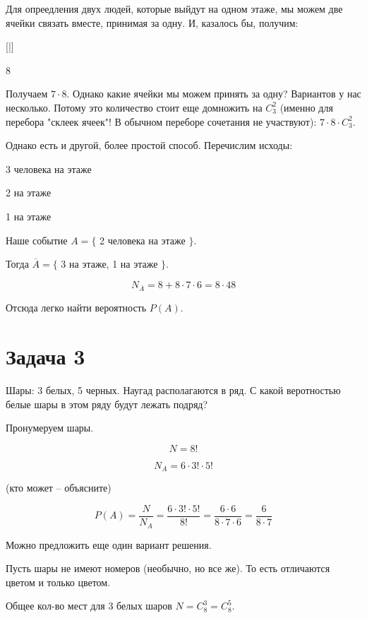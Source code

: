 \documentclass{article}
\begin{document}
Для опреедления двух людей, которые выйдут на одном этаже, мы можем две ячейки связать вместе, принимая за одну. И, казалось бы, получим:
\begin{center}
  [\qquad\qquad|\qquad]

     8 \qquad{}
\end{center}

Получаем $7 \cdot 8$. Однако какие ячейки мы можем принять за одну? Вариантов у нас несколько. Потому это количество стоит еще домножить на $C_3^2$ (именно для перебора "склеек ячеек"! В обычном переборе сочетания не участвуют): $7 \cdot 8 \cdot C_3^2$.

\quad

Однако есть и другой, более простой способ. Перечислим исходы:

\quad

3 человека на этаже

2 на этаже

1 на этаже

\quad

Наше событие $A = \{$ 2 человека на этаже $\}$.

Тогда $\overline{A} = \{$ 3 на этаже, 1 на этаже $\}$.

$$N_{\overline{A}} = 8 + 8 \cdot 7 \cdot 6 = 8 \cdot 48 $$

Отсюда легко найти вероятность $P(A)$.

\section{Задача 3}

Шары: 3 белых, 5 черных. Наугад располагаются в ряд. С какой веротностью белые шары в этом ряду будут лежать подряд?

\quad

Пронумеруем шары.

$$N = 8!$$

$$N_A = 6 \cdot 3! \cdot 5!$$

(кто может -- объясните)

$$P(A) = \frac{N}{N_A} = \frac{6 \cdot 3! \cdot 5!}{8!} = \frac{6 \cdot 6}{8 \cdot 7 \cdot 6} = \frac{6}{8 \cdot 7}$$

\quad

Можно предложить еще один вариант решения. 

Пусть шары не имеют номеров (необычно, но все же). То есть отличаются цветом и только цветом.

Общее кол-во мест для 3 белых шаров $N = C_8^3 = C_8^5$.
\end{document}
